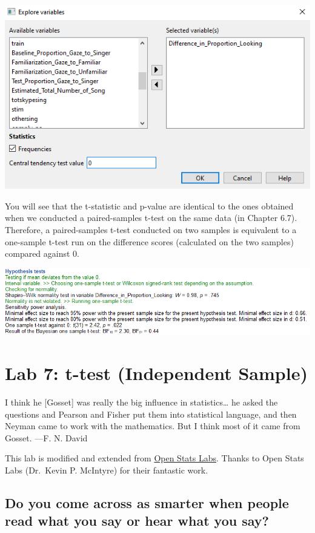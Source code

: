 \documentclass[
]{book}
\begin{document}
\includegraphics{img/ch6/6.8expvar_window.png}

You will see that the t-statistic and p-value are identical to the ones obtained when we conducted a paired-samples t-test on the same data (in Chapter 6.7). Therefore, a paired-samples t-test conducted on two samples is equivalent to a one-sample t-test run on the difference scores (calculated on the two samples) compared against 0.

\includegraphics{img/ch6/6.8expvar_hyptest.png}

\hypertarget{lab-7-t-test-independent-sample}{%
\chapter{Lab 7: t-test (Independent Sample)}\label{lab-7-t-test-independent-sample}}

{
I think he {[}Gosset{]} was really the big influence in
statistics\ldots{} he asked the questions and Pearson and Fisher put them into statistical language, and then Neyman came to work with the mathematics. But I think
most of it came from Gosset.
---F. N. David
}

This lab is modified and extended from \href{https://sites.trinity.edu/osl}{Open Stats Labs}. Thanks to Open Stats Labs (Dr.~Kevin P. McIntyre) for their fantastic work.

\hypertarget{do-you-come-across-as-smarter-when-people-read-what-you-say-or-hear-what-you-say}{%
\section{Do you come across as smarter when people read what you say or hear what you say?}\label{do-you-come-across-as-smarter-when-people-read-what-you-say-or-hear-what-you-say}}
\end{document}
